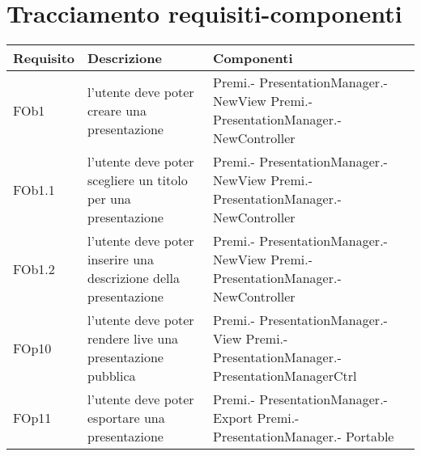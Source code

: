 \newpage
\section{Tracciamento requisiti-componenti}	
\begin{longtable}{|l|p{5cm}|p{4cm}|}
\hline
\textbf{Requisito}  & \textbf{Descrizione} & \textbf{Componenti} \\
\hline
FOb1 & l'utente deve poter creare una presentazione & Premi.- \linebreak PresentationManager.- \linebreak NewView \linebreak Premi.- \linebreak PresentationManager.- \linebreak NewController \linebreak \\
\hline
FOb1.1 & l'utente deve poter scegliere un titolo per una presentazione & Premi.- \linebreak PresentationManager.- \linebreak NewView \linebreak Premi.- \linebreak PresentationManager.- \linebreak NewController \linebreak \\
\hline
FOb1.2 & l'utente deve poter inserire una descrizione della presentazione & Premi.- \linebreak PresentationManager.- \linebreak NewView \linebreak Premi.- \linebreak PresentationManager.- \linebreak NewController \linebreak \\
\hline
FOp10 & l'utente deve poter rendere live una presentazione pubblica & Premi.- \linebreak PresentationManager.- \linebreak View \linebreak Premi.- \linebreak PresentationManager.- \linebreak PresentationManagerCtrl \linebreak \\
\hline
FOp11 & l'utente deve poter esportare una presentazione & Premi.- \linebreak PresentationManager.- \linebreak Export \linebreak Premi.- \linebreak PresentationManager.- \linebreak Portable \linebreak \\

\end{longtable}
